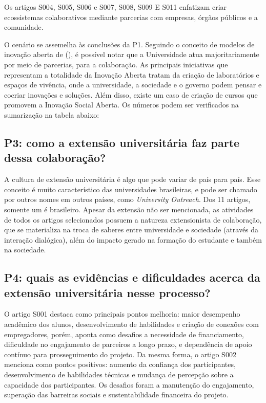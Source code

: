 Os artigos S004, S005, S006 e S007, S008, S009 E S011 enfatizam criar ecossistemas colaborativos mediante parcerias com empresas, órgãos públicos e a comunidade. 

O cenário se assemelha às conclusões da P1. Seguindo o conceito de modelos de inovação aberta de \citeauthor{brunswicker2018} (\citeyear{brunswicker2018}), é possível notar que a Universidade atua majoritariamente por meio de parcerias, para a colaboração. As principais iniciativas que representam a totalidade da Inovação Aberta tratam da criação de laboratórios e espaços de vivência, onde a universidade, a sociedade e o governo podem pensar e cocriar inovações e soluções. Além disso, existe um caso de criação de cursos que promovem a Inovação Social Aberta. Os números podem ser verificados na sumarização na tabela abaixo:
 




\subsection{P3: como a extensão universitária faz parte dessa colaboração?}

A cultura de extensão universitária é algo que pode variar de país para país. Esse conceito é muito característico das universidades brasileiras, e pode ser chamado por outros nomes em outros países, como \textit{University Outreach}. Dos 11 artigos, somente um é brasileiro. Apesar da extensão não ser mencionada, as atividades de todos os artigos selecionados possuem a natureza extensionista de colaboração, que se materializa na troca de saberes entre universidade e sociedade (através da interação dialógica), além do impacto gerado na formação do estudante e também na sociedade.


\subsection{P4: quais as evidências e dificuldades acerca da extensão universitária nesse processo?}

O artigo S001 destaca como principais pontos melhoria: maior desempenho acadêmico dos alunos, desenvolvimento de habilidades e criação de conexões com empregadores, porém, aponta como desafios a necessidade de financiamento, dificuldade no engajamento de parceiros a longo prazo, e dependência de apoio contínuo para prosseguimento do projeto. Da mesma forma, o artigo S002 menciona como pontos positivos: aumento da confiança dos participantes, desenvolvimento de habilidades técnicas e mudança de percepção sobre a capacidade dos participantes. Os desafios foram a manutenção do engajamento, superação das barreiras sociais e sustentabilidade financeira do projeto. 

